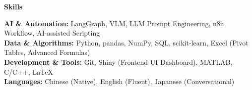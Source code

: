 \documentclass[11pt]{article}
\begin{document}
\vspace{-5pt}
\begin{center}
    \textbf{Skills} \\
    \vspace{-5pt}
    \hrulefill
\end{center}
\vspace{-3pt}

\textbf{AI \& Automation:} LangGraph, VLM, LLM Prompt Engineering, n8n Workflow, AI-assisted Scripting \\
\textbf{Data \& Algorithms:} Python, pandas, NumPy, SQL, scikit-learn, Excel (Pivot Tables, Advanced Formulas) \\
\textbf{Development \& Tools:} Git, Shiny (Frontend UI Dashboard), MATLAB, C/C++, LaTeX \\
\textbf{Languages:} Chinese (Native), English (Fluent), Japanese (Conversational)
\end{document}
